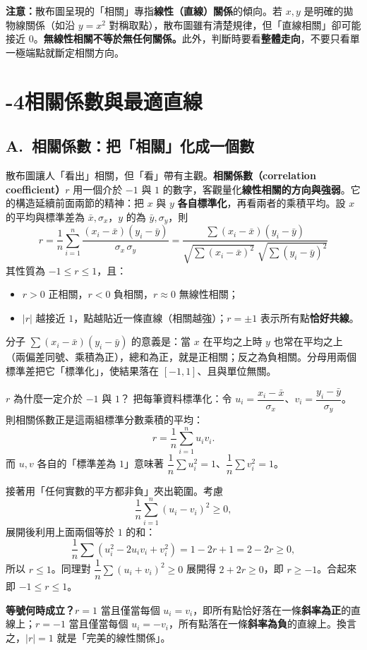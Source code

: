 \documentclass[11pt]{article}
\begin{document}
\textbf{注意：}散布圖呈現的「相關」專指\textbf{線性（直線）關係}的傾向。若 $x,y$ 是明確的拋物線關係（如沿 $y=x^2$ 對稱取點），散布圖雖有清楚規律，但「直線相關」卻可能接近 $0$。\textbf{無線性相關不等於無任何關係。}此外，判斷時要看\textbf{整體走向}，不要只看單一極端點就斷定相關方向。

\section*{-4\quad 相關係數與最適直線}

\subsection*{\sffamily A.\ 相關係數：把「相關」化成一個數}

散布圖讓人「看出」相關，但「看」帶有主觀。\textbf{相關係數（correlation coefficient）}$r$ 用一個介於 $-1$ 與 $1$ 的數字，客觀量化\textbf{線性相關的方向與強弱}。它的構造延續前面兩節的精神：把 $x$ 與 $y$ \textbf{各自標準化}，再看兩者的乘積平均。設 $x$ 的平均與標準差為 $\bar{x},\sigma_x$，$y$ 的為 $\bar{y},\sigma_y$，則
$$\boxed{\;r = \frac{1}{n}\sum_{i=1}^{n}\frac{(x_i-\bar{x})(y_i-\bar{y})}{\sigma_x\,\sigma_y} = \frac{\displaystyle\sum (x_i-\bar{x})(y_i-\bar{y})}{\sqrt{\displaystyle\sum (x_i-\bar{x})^2}\;\sqrt{\displaystyle\sum (y_i-\bar{y})^2}}\;}$$
其性質為 $-1 \le r \le 1$，且：
\begin{itemize}\setlength{\itemsep}{1pt}
\item $r>0$ 正相關，$r<0$ 負相關，$r\approx 0$ 無線性相關；
\item $|r|$ 越接近 $1$，點越貼近一條直線（相關越強）；$r=\pm 1$ 表示所有點\textbf{恰好共線}。
\end{itemize}

分子 $\sum(x_i-\bar{x})(y_i-\bar{y})$ 的意義是：當 $x$ 在平均之上時 $y$ 也常在平均之上（兩偏差同號、乘積為正），總和為正，就是正相關；反之為負相關。分母用兩個標準差把它「標準化」，使結果落在 $[-1,1]$、且與單位無關。

\begin{補充框}{$r$ 為什麼一定介於 $-1$ 與 $1$？}
把每筆資料標準化：令 $u_i=\dfrac{x_i-\bar x}{\sigma_x}$、$v_i=\dfrac{y_i-\bar y}{\sigma_y}$。則相關係數正是這兩組標準分數乘積的平均：
$$r = \frac1n\sum_{i=1}^{n} u_i v_i.$$
而 $u,v$ 各自的「標準差為 $1$」意味著 $\dfrac1n\sum u_i^2 = 1$、$\dfrac1n\sum v_i^2 = 1$。

接著用「任何實數的平方都非負」夾出範圍。考慮
$$\frac1n\sum_{i=1}^{n}(u_i - v_i)^2 \ge 0,$$
展開後利用上面兩個等於 $1$ 的和：
$$\frac1n\sum (u_i^2 - 2u_i v_i + v_i^2) = 1 - 2r + 1 = 2 - 2r \ge 0,$$
所以 $r\le 1$。同理對 $\dfrac1n\sum(u_i+v_i)^2\ge0$ 展開得 $2+2r\ge0$，即 $r\ge-1$。合起來即 $-1 \le r \le 1$。

\textbf{等號何時成立？}$r=1$ 當且僅當每個 $u_i=v_i$，即所有點恰好落在一條\textbf{斜率為正}的直線上；$r=-1$ 當且僅當每個 $u_i=-v_i$，所有點落在一條\textbf{斜率為負}的直線上。換言之，$|r|=1$ 就是「完美的線性關係」。
\end{補充框}
\end{document}
